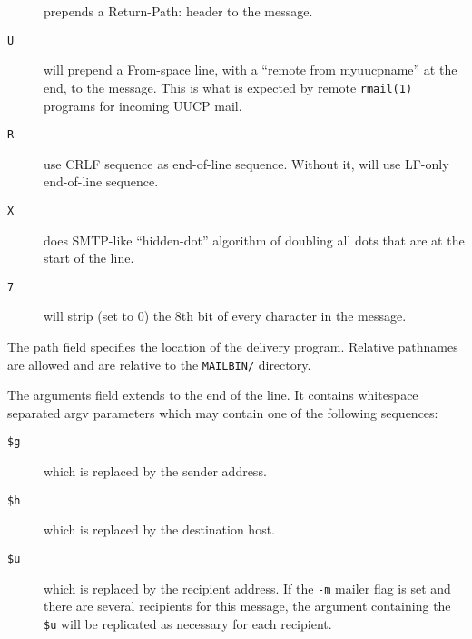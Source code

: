 \begin{description}
prepends a Return-Path: header to the message.



\item[ {\tt U}] \mbox{}

will prepend a From-space line, with a ``remote from
myuucpname'' at the end, to the message. This is what is expected by remote 
{\tt rmail(1)} programs for incoming UUCP mail.



\item[ {\tt R}] \mbox{}

use CRLF sequence as end-of-line sequence. Without
it, will use LF-only end-of-line sequence.



\item[ {\tt X}] \mbox{}

does SMTP-like ``hidden-dot'' algorithm  of doubling
all dots that are at the start of the line.



\item[ {\tt 7}] \mbox{}

will strip (set to 0) the 8th bit of every character in the 
message.

\end{description}


The path field specifies the location of the delivery program. Relative 
pathnames are allowed and are relative to the {\tt MAILBIN/} directory.

The arguments field extends to the end of the line. It
contains  whitespace separated  argv  parameters which may
contain one of the following sequences:

\begin{description}
\item[ {\tt \$g}] \mbox{}

which is replaced by the sender address.



\item[ {\tt \$h}] \mbox{}

which is replaced by the destination host.



\item[ {\tt \$u}] \mbox{}

which is replaced by the recipient address.  If the
{\tt -m} mailer flag is set and there are several recipients for this 
message, the argument containing  the {\tt \$u} will be replicated 
as necessary for each recipient.
\end{description}
